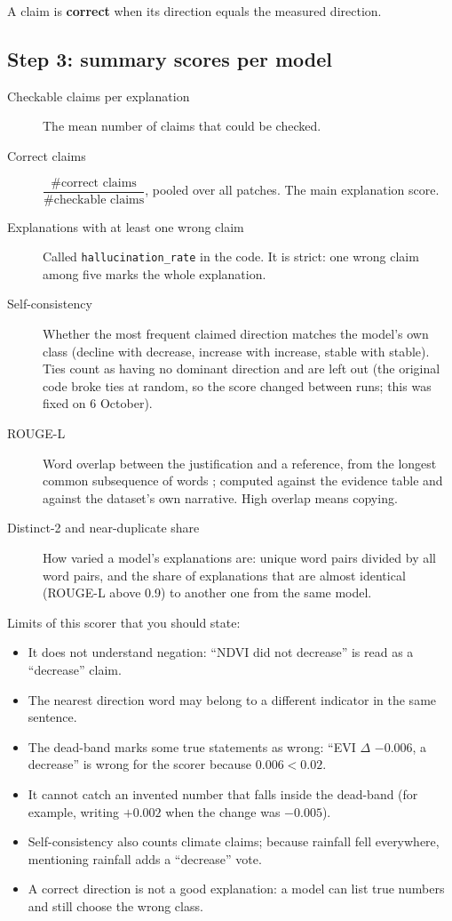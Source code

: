 A claim is \textbf{correct} when its direction equals the measured direction.

\subsection{Step 3: summary scores per model}

\begin{description}
  \item[Checkable claims per explanation] The mean number of claims that could be checked.
  \item[Correct claims] $\dfrac{\#\text{correct claims}}{\#\text{checkable claims}}$, pooled over all patches. The main explanation score.
  \item[Explanations with at least one wrong claim] Called \texttt{hallucination\_rate} in the code. It is strict: one wrong claim among five marks the whole explanation.
  \item[Self-consistency] Whether the most frequent claimed direction matches the model's own class (decline with decrease, increase with increase, stable with stable). Ties count as having no dominant direction and are left out (the original code broke ties at random, so the score changed between runs; this was fixed on 6 October).
  \item[ROUGE-L] Word overlap between the justification and a reference, from the longest common subsequence of words \citep{lin2004rouge}; computed against the evidence table and against the dataset's own narrative. High overlap means copying.
  \item[Distinct-2 and near-duplicate share] How varied a model's explanations are: unique word pairs divided by all word pairs, and the share of explanations that are almost identical (ROUGE-L above 0.9) to another one from the same model.
\end{description}

\begin{watchout}
Limits of this scorer that you should state:
\begin{itemize}
  \item It does not understand negation: ``NDVI did not decrease'' is read as a ``decrease'' claim.
  \item The nearest direction word may belong to a different indicator in the same sentence.
  \item The dead-band marks some true statements as wrong: ``EVI $\Delta$ $-0.006$, a decrease'' is wrong for the scorer because $0.006 < 0.02$.
  \item It cannot catch an invented number that falls inside the dead-band (for example, writing $+0.002$ when the change was $-0.005$).
  \item Self-consistency also counts climate claims; because rainfall fell everywhere, mentioning rainfall adds a ``decrease'' vote.
  \item A correct direction is not a good explanation: a model can list true numbers and still choose the wrong class.
\end{itemize}
\end{watchout}

